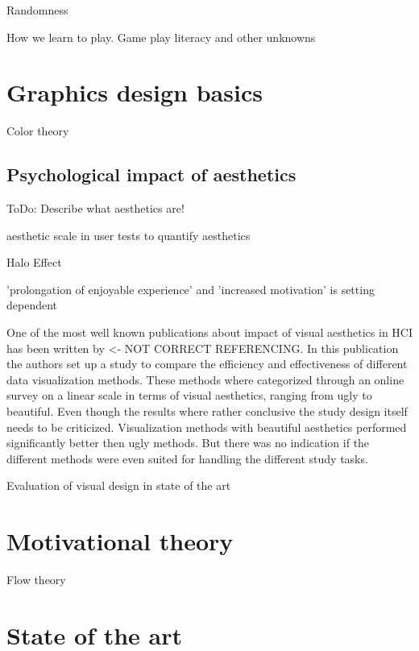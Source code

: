 Randomness

How we learn to play. Game play literacy and other unknowns


\section{Graphics design basics}

Color theory

\subsection{Psychological impact of aesthetics}

ToDo: Describe what aesthetics are!

aesthetic scale in user tests to quantify aesthetics

Halo Effect

'prolongation of enjoyable experience' and 'increased motivation' is setting dependent \cite{sonderegger2010influence}

One of the most well known publications about impact of visual aesthetics in \gls{HCI} has been written by  <- NOT CORRECT REFERENCING.
In this publication the authors set up a study to compare the efficiency and effectiveness of different data visualization methods.
These methods where categorized through an online survey on a linear scale in terms of visual aesthetics, ranging from ugly to beautiful.
Even though the results where rather conclusive the study design itself needs to be criticized.
Visualization methods with beautiful aesthetics performed significantly better then ugly methods. 
But there was no indication if the different methods were even suited for handling the different study tasks.

Evaluation of visual design in state of the art

\section{Motivational theory}

Flow theory

\section{State of the art}

